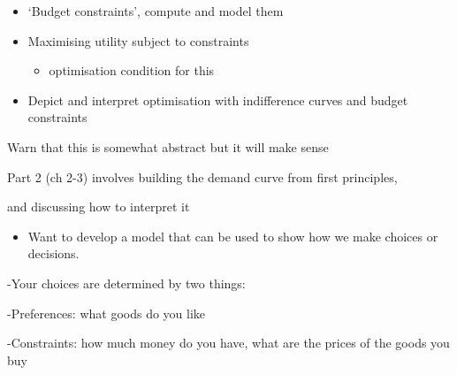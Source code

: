\documentclass[table]{beamer}
\providecommand{\tightlist}{%
  \setlength{\itemsep}{0pt}\setlength{\parskip}{0pt}}
\begin{document}
\begin{frame}

\begin{itemize}
\tightlist
\item
  `Budget constraints', compute and model them
\end{itemize}

\begin{itemize}
\tightlist
\item
  Maximising utility subject to constraints

  \begin{itemize}
  \tightlist
  \item
    optimisation condition for this
  \end{itemize}
\end{itemize}

\begin{itemize}
\tightlist
\item
  Depict and interpret optimisation with indifference curves and budget
  constraints
\end{itemize}

Warn that this is somewhat abstract but it will make sense

Part 2 (ch 2-3) involves building the demand curve from first
principles,

and discussing how to interpret it

\begin{itemize}
\tightlist
\item
  Want to develop a model that can be used to show how we make choices
  or decisions.
\end{itemize}

-Your choices are determined by two things:

-Preferences: what goods do you like

-Constraints: how much money do you have, what are the prices of the
goods you buy

\end{frame}
\end{document}
